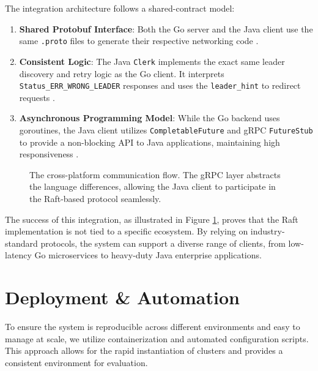 The integration architecture follows a shared-contract model:
\begin{enumerate}
    \item \textbf{Shared Protobuf Interface}: Both the Go server and the Java client use the same \texttt{.proto} files to generate their respective networking code \cite{10, 11}.
    \item \textbf{Consistent Logic}: The Java \texttt{Clerk} implements the exact same leader discovery and retry logic as the Go client. It interprets \texttt{Status\_ERR\_WRONG\_LEADER} responses and uses the \texttt{leader\_hint} to redirect requests \cite{24, 25}.
    \item \textbf{Asynchronous Programming Model}: While the Go backend uses goroutines, the Java client utilizes \texttt{CompletableFuture} and gRPC \texttt{FutureStub} to provide a non-blocking API to Java applications, maintaining high responsiveness \cite{24}.
\end{enumerate}

\begin{figure}[h]
    \centering
    \caption{The cross-platform communication flow. The gRPC layer abstracts the language differences, allowing the Java client to participate in the Raft-based protocol seamlessly.}
    \label{fig:cross_lang_interop}
\end{figure}

The success of this integration, as illustrated in Figure \ref{fig:cross_lang_interop}, proves that the Raft implementation is not tied to a specific ecosystem. By relying on industry-standard protocols, the system can support a diverse range of clients, from low-latency Go microservices to heavy-duty Java enterprise applications.

\section{Deployment \& Automation}
\label{sec:deployment_automation}
To ensure the system is reproducible across different environments and easy to manage at scale, we utilize containerization and automated configuration scripts. This approach allows for the rapid instantiation of clusters and provides a consistent environment for evaluation.

